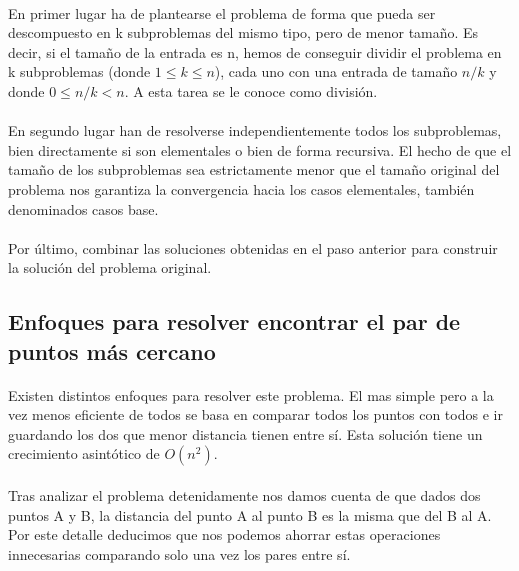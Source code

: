 \documentclass{article}
\begin{document}
		\paragraph{}
		En primer lugar ha de plantearse el problema de forma que pueda ser descompuesto en k subproblemas del mismo tipo, pero de menor tamaño. Es decir, si el tamaño de la entrada es n, hemos de conseguir dividir el problema en k subproblemas (donde $1 \leq k \leq n$), cada uno con una entrada de tamaño $n/k$ y donde $0 \leq n/k < n$. A esta tarea se le conoce como división.
		
		\paragraph{}
		En segundo lugar han de resolverse independientemente todos los subproblemas, bien directamente si son elementales o bien de forma recursiva. El hecho de que el tamaño de los subproblemas sea estrictamente menor que el tamaño original del problema nos garantiza la convergencia hacia los casos elementales, también denominados casos base.
		
		\paragraph{}
		Por último, combinar las soluciones obtenidas en el paso anterior para construir la solución del problema original.
		
	\subsection{Enfoques para resolver encontrar el par de puntos más cercano}


		\paragraph{}
		Existen distintos enfoques para resolver este problema. El mas simple pero a la vez menos eficiente de todos se basa en comparar todos los puntos con todos e ir guardando los dos que menor distancia tienen entre sí. Esta solución tiene un crecimiento asintótico de $O(n^2)$.

		\paragraph{}
		Tras analizar el problema detenidamente nos damos cuenta de que dados dos puntos A y B, la distancia del punto A al punto B es la misma que del B al A. Por este detalle deducimos que nos podemos ahorrar estas operaciones innecesarias comparando solo una vez los pares entre sí.
	
\end{document}
